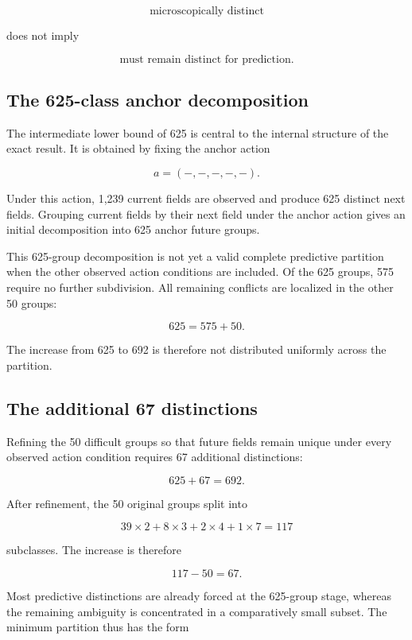 \documentclass[
  11pt,
]{article}
\begin{document}
\[{\text{microscopically distinct}}\]

does not imply

\[{\text{must remain distinct for prediction}.}\]

\hypertarget{the-625-class-anchor-decomposition}{%
\subsection{The 625-class anchor
decomposition}\label{the-625-class-anchor-decomposition}}

The intermediate lower bound of 625 is central to the internal structure
of the exact result. It is obtained by fixing the anchor action

\[{a=(-,-,-,-,-).}\]

Under this action, 1,239 current fields are observed and produce 625
distinct next fields. Grouping current fields by their next field under
the anchor action gives an initial decomposition into 625 anchor future
groups.

This 625-group decomposition is not yet a valid complete predictive
partition when the other observed action conditions are included. Of the
625 groups, 575 require no further subdivision. All remaining conflicts
are localized in the other 50 groups:

\[{625=575+50.}\]

The increase from 625 to 692 is therefore not distributed uniformly
across the partition.

\hypertarget{the-additional-67-distinctions}{%
\subsection{The additional 67
distinctions}\label{the-additional-67-distinctions}}

Refining the 50 difficult groups so that future fields remain unique
under every observed action condition requires 67 additional
distinctions:

\[{625+67=692.}\]

After refinement, the 50 original groups split into

\[{39\times2+8\times3+2\times4+1\times7=117}\]

subclasses. The increase is therefore

\[{117-50=67.}\]

Most predictive distinctions are already forced at the 625-group stage,
whereas the remaining ambiguity is concentrated in a comparatively small
subset. The minimum partition thus has the form
\end{document}
